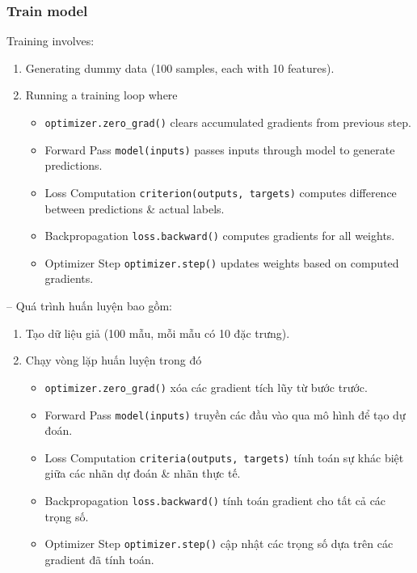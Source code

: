 \documentclass{article}
\begin{document}
\subsubsection{Train model}
Training involves:
\begin{enumerate}
    \item Generating dummy data (100 samples, each with 10 features).
    \item Running a training loop where
    \begin{itemize}
        \item \verb|optimizer.zero_grad()| clears accumulated gradients from previous step.
        \item Forward Pass {\tt model(inputs)} passes inputs through model to generate predictions.
        \item Loss Computation {\tt criterion(outputs, targets)} computes difference between predictions \& actual labels.
        \item Backpropagation {\tt loss.backward()} computes gradients for all weights.
        \item Optimizer Step {\tt optimizer.step()} updates weights based on computed gradients.
    \end{itemize}
\end{enumerate}
-- Quá trình huấn luyện bao gồm:
\begin{enumerate}
    \item Tạo dữ liệu giả (100 mẫu, mỗi mẫu có 10 đặc trưng).
    \item Chạy vòng lặp huấn luyện trong đó
    \begin{itemize}
        \item \verb|optimizer.zero_grad()| xóa các gradient tích lũy từ bước trước.
        \item Forward Pass {\tt model(inputs)} truyền các đầu vào qua mô hình để tạo dự đoán.
        \item Loss Computation {\tt criteria(outputs, targets)} tính toán sự khác biệt giữa các nhãn dự đoán \& nhãn thực tế.
        \item Backpropagation {\tt loss.backward()} tính toán gradient cho tất cả các trọng số.
        \item Optimizer Step {\tt optimizer.step()} cập nhật các trọng số dựa trên các gradient đã tính toán.
    \end{itemize}
\end{enumerate}

\end{document}
